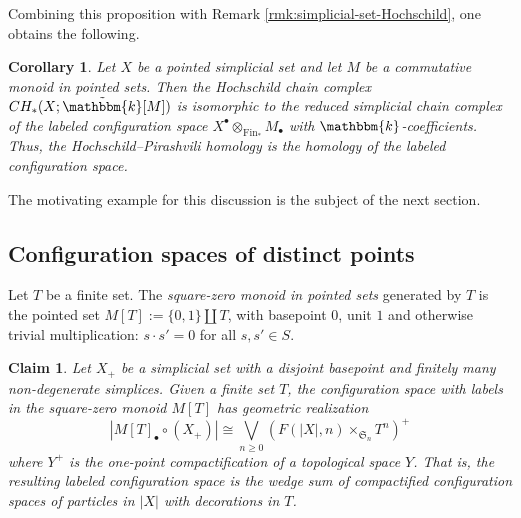 \documentclass[12pt]{article}
\newcommand{\kk}{\mathbbm{k}}
\newcommand{\SymGroup}[1][n]{\mathfrak{S}_{#1}}
\newcommand{\ConfLabeled}[2]{{#1}^{\bullet}\otimes_{\Fin_{\ast}}{#2}_{\bullet}}
\DeclareMathOperator{\Fin}{Fin}
\theoremstyle{plain}
\newtheorem{cor}[thm]{Corollary}
\newtheorem{claim}[thm]{Claim}
\theoremstyle{definition}
\theoremstyle{remark}
\begin{document}
Combining this proposition with Remark \ref{rmk:simplicial-set-Hochschild}, one obtains the following.

\begin{cor}
    Let $X$ be a pointed simplicial set and let $M$ be a commutative monoid in pointed sets. Then the Hochschild chain complex $CH_*( X; \tilde{\kk}[M] )$ %
    is isomorphic to the reduced simplicial chain complex of the labeled configuration space $\ConfLabeled{X}{M}$ with $\kk$-coefficients.
    Thus, the Hochschild--Pirashvili homology is the homology of the labeled configuration space.
\end{cor}

The motivating example for this discussion is the subject of the next section.

\subsection{Configuration spaces of distinct points} \label{sec:labeled configs}
Let $T$ be a finite set. The \emph{square-zero monoid in pointed sets} generated by $T$ is the pointed set $M[T]:= \{0,1\} \coprod T$, with basepoint $0$, unit $1$ and otherwise trivial multiplication: $s \cdot s' = 0$ for all $s, s'\in S$. %

\begin{claim}\label{geometric-realization-labeled}
Let $X_+$ be a simplicial set with a disjoint basepoint and finitely many non-degenerate simplices. Given a finite set $T$, the configuration space with labels in the square-zero monoid $M[T]$ has geometric realization 
\begin{equation*}
|M[T]_{\bullet}\circ (X_+)| \cong  \bigvee_{n\geq 0} \left(F(|X|,n)\times_{\SymGroup[n]} T^n   \right)^+
\end{equation*}
where $Y^+$ is the one-point compactification of a topological space $Y$. That is, the resulting labeled configuration space is the wedge sum of compactified configuration spaces of particles in $|X|$ with decorations in $T$.
\end{claim}
\end{document}
